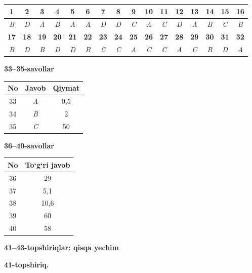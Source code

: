 \documentclass[11pt,a4paper]{article}
\begin{document}
\noindent\begin{tabular}{|c|c|c|c|c|c|c|c|c|c|c|c|c|c|c|c|}\hline
\textbf{1} & \textbf{2} & \textbf{3} & \textbf{4} & \textbf{5} & \textbf{6} & \textbf{7} & \textbf{8} & \textbf{9} & \textbf{10} & \textbf{11} & \textbf{12} & \textbf{13} & \textbf{14} & \textbf{15} & \textbf{16}\\\hline
\textsl{B} & \textsl{D} & \textsl{A} & \textsl{B} & \textsl{A} & \textsl{A} & \textsl{D} & \textsl{D} & \textsl{C} & \textsl{A} & \textsl{C} & \textsl{D} & \textsl{A} & \textsl{B} & \textsl{C} & \textsl{B}\\\hline
\textbf{17} & \textbf{18} & \textbf{19} & \textbf{20} & \textbf{21} & \textbf{22} & \textbf{23} & \textbf{24} & \textbf{25} & \textbf{26} & \textbf{27} & \textbf{28} & \textbf{29} & \textbf{30} & \textbf{31} & \textbf{32}\\\hline
\textsl{B} & \textsl{D} & \textsl{B} & \textsl{D} & \textsl{D} & \textsl{B} & \textsl{C} & \textsl{C} & \textsl{A} & \textsl{C} & \textsl{C} & \textsl{A} & \textsl{C} & \textsl{B} & \textsl{D} & \textsl{A}\\\hline
\end{tabular}\par\medskip
\noindent\textbf{33--35-savollar}\par\smallskip
\noindent\begin{tabular}{|c|c|c|}\hline \textbf{No} & \textbf{Javob} & \textbf{Qiymat}\\\hline
33 & \textsl{A} & 0,5\\\hline
34 & \textsl{B} & 2\\\hline
35 & \textsl{C} & 50\\\hline
\end{tabular}\par\medskip
\noindent\textbf{36--40-savollar}\par\smallskip
\noindent\begin{tabular}{|c|c|}\hline \textbf{No} & \textbf{To`g`ri javob}\\\hline
36 & 29\\\hline
37 & 5,1\\\hline
38 & 10,6\\\hline
39 & 60\\\hline
40 & 58\\\hline
\end{tabular}\par\medskip
\noindent\textbf{41--43-topshiriqlar: qisqa yechim}\par\smallskip
\noindent\textbf{41-topshiriq.}\par
\end{document}
